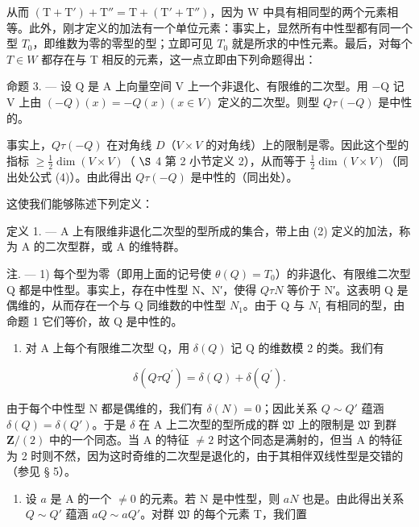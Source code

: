 从而 \((\mathrm{T} + \mathrm{T}' ) + \mathrm{T}'' = \mathrm{T} + (\mathrm{T}' + \mathrm{T}'' )\)，因为 W 中具有相同型的两个元素相等。此外，刚才定义的加法有一个单位元素：事实上，显然所有中性型都有同一个型 \(T_{0}\)，即维数为零的零型的型；立即可见 \(T_{0}\) 就是所求的中性元素。最后，对每个 \(T \in W\) 都存在与 T 相反的元素，这一点立即由下列命题得出：

命题 3. — 设 Q 是 A 上向量空间 V 上一个非退化、有限维的二次型。用 −Q 记 V 上由 \((-Q)(x) = -Q(x) (x \in V)\) 定义的二次型。则型 \(Q \tau (-Q)\) 是中性的。

  事实上，\(Q \tau (-Q)\) 在对角线 \(D\)（\(V \times V\) 的对角线）上的限制是零。因此这个型的指标 \(\geqslant\frac{1}{2}\dim(V\times V)\)（ \(\S\) 4 第 2 小节定义 2），从而等于 \(\frac{1}{2}\dim(V\times V)\)（同出处公式 (4)）。由此得出 \(Q\tau(-Q)\) 是中性的（同出处）。

  这使我们能够陈述下列定义：

定义 1. --- A 上有限维非退化二次型的型所成的集合，带上由 (2) 定义的加法，称为 A 的二次型群，或 A 的维特群。

注. --- 1) 每个型为零（即用上面的记号使 \(\theta(Q) = T_0\)）的非退化、有限维二次型 Q 都是中性型。事实上，存在中性型 N、N′，使得 \(Q \tau N\) 等价于 N′。这表明 Q 是偶维的，从而存在一个与 Q 同维数的中性型 \(N_1\)。由于 Q 与 \(N_1\) 有相同的型，由命题 1 它们等价，故 Q 是中性的。

\begin{enumerate}
\def\labelenumi{\arabic{enumi})}
\setcounter{enumi}{1}
\tightlist
\item
  对 A 上每个有限维二次型 Q，用 \(\delta(Q)\) 记 Q 的维数模 2 的类。我们有
\end{enumerate}

\[
\delta (Q \tau Q ^ {\prime}) = \delta (Q) + \delta (Q ^ {\prime}).
\]

  由于每个中性型 N 都是偶维的，我们有 \(\delta(N) = 0\)；因此关系 \(Q \sim Q'\) 蕴涵 \(\delta(Q) = \delta(Q')\)。于是 \(\delta\) 在 A 上二次型的型所成的群 \(\mathfrak{W}\) 上的限制是 \(\mathfrak{W}\) 到群 \(\mathbf{Z}/(2)\) 中的一个同态。当 A 的特征 \(\neq 2\) 时这个同态是满射的，但当 A 的特征为 2 时则不然，因为这时奇维的二次型是退化的，由于其相伴双线性型是交错的（参见 § 5）。

\begin{enumerate}
\def\labelenumi{\arabic{enumi})}
\setcounter{enumi}{2}
\tightlist
\item
  设 \(a\) 是 A 的一个 \(\neq 0\) 的元素。若 N 是中性型，则 \(aN\) 也是。由此得出关系 \(Q \sim Q'\) 蕴涵 \(aQ \sim aQ'\)。对群 \(\mathfrak{W}\) 的每个元素 T，我们置
\end{enumerate}

